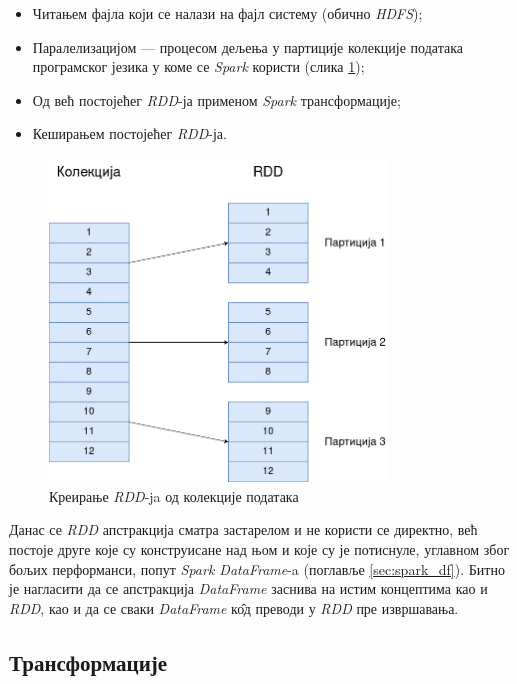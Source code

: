 \documentclass[12pt,oneside]{memoir}
\begin{document}
\begin{itemize}
\item Читањем фајла који се налази на фајл систему (обично \textit{HDFS});
\item Паралелизацијом --- процесом дељења у партиције колекције података програмског језика у коме се \textit{Spark} користи (слика \ref{fig:spark_rdd_creation_png});
\item Од већ постојећег \textit{RDD}-ја применом \textit{Spark} трансформације;
\item Кеширањем постојећег \textit{RDD}-ја.
\end{itemize}

\begin{figure}[!ht]
  \centering
  \includegraphics[width=0.80\textwidth]{pictures/spark_rdd_creation.png}
  \caption{Креирање \textit{RDD}-ja од колекције података}
  \label{fig:spark_rdd_creation_png}
\end{figure}

Данас се \textit{RDD} апстракција сматра застарелом и не користи се директно, већ постоје друге које су конструисане над њом и које су је потиснуле, углавном због бољих перформанси, попут \textit{Spark DataFrame}-a (поглавље \ref{sec:spark_df}). Битно је нагласити да се апстракција \textit{DataFrame} заснива на истим концептима као и \textit{RDD}, као и да се сваки \textit{DataFrame} к\^{о}д преводи у \textit{RDD} пре извршавања.

\subsection{Трансформације}
\label{subsec:spark_transf}
\end{document}
